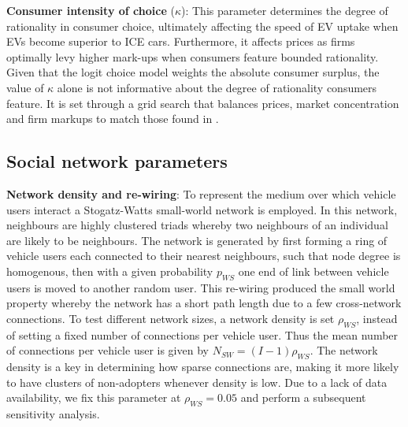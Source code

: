 \documentclass[12pt]{article}
\begin{document}
	\textbf{Consumer intensity of choice} ($\kappa$): This parameter determines the degree of rationality in consumer choice, ultimately affecting the speed of EV uptake when EVs become superior to ICE cars. Furthermore, it affects prices as firms optimally levy higher mark-ups when consumers feature bounded rationality. Given that the logit choice model weights the absolute consumer surplus, the value of $\kappa$ alone is not informative about the degree of rationality consumers feature. It is set through a grid search that balances prices, market concentration and firm markups to match those found in \citet{Grieco2024MarketPower}.
	
	\subsection{Social network parameters} \label{Callibration_SocialNetwork}
	
	\textbf{Network density and re-wiring}: To represent the medium over which vehicle users interact a Stogatz-Watts small-world network \citep{watts1998collective} is employed. In this network, neighbours are highly clustered triads whereby two neighbours of an individual are likely to be neighbours. The network is generated by first forming a ring of vehicle users each connected to their nearest neighbours, such that node degree is homogenous, then with a given probability $p_{WS}$ one end of link between vehicle users is moved to another random user. This re-wiring produced the small world property whereby the network has a short path length due to a few cross-network connections. To test different network sizes, a network density is set $\rho_{WS}$, instead of setting a fixed number of connections per vehicle user. Thus the mean number of connections per vehicle user is given by $N_{SW} = (I- 1)\rho_{WS}$. The network density is 
	a key in determining how sparse connections are, making it more likely to have clusters of non-adopters whenever density is low. Due to a lack of data availability, we fix this parameter at $\rho_{WS} = 0.05$ and perform a subsequent sensitivity analysis. 
	
\end{document}
